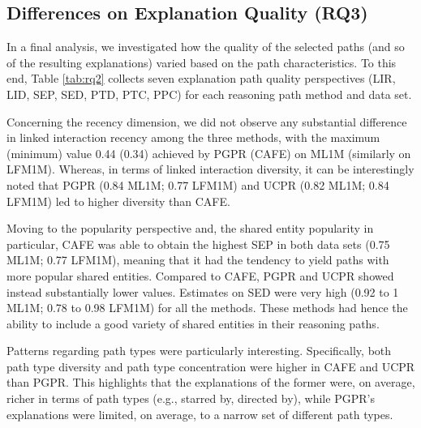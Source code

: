 \documentclass[runningheads]{llncs}
\begin{document}
\subsection{Differences on Explanation Quality (RQ3)}
\label{sec:rq2}
In a final analysis, we investigated how the quality of the selected paths (and so of the resulting explanations) varied based on the path characteristics. 
To this end, Table \ref{tab:rq2} collects seven explanation path quality perspectives (LIR, LID, SEP, SED, PTD, PTC, PPC) for each reasoning path method and data set. 

Concerning the recency dimension, we did not observe any substantial difference in linked interaction recency among the three methods, 
with the maximum (minimum) value 0.44 (0.34) achieved by PGPR (CAFE) on ML1M (similarly on LFM1M).
Whereas, in terms of linked interaction diversity, it can be interestingly noted that PGPR (0.84 ML1M; 0.77 LFM1M) and UCPR (0.82 ML1M; 0.84 LFM1M) led to higher diversity than CAFE. 

Moving to the popularity perspective and, the shared entity popularity in particular, 
CAFE was able to obtain the highest SEP in both data sets (0.75 ML1M; 0.77 LFM1M), 
meaning that it had the tendency to yield paths with more popular shared entities. 
Compared to CAFE, PGPR and UCPR showed instead substantially lower values.
Estimates on SED were very high (0.92 to 1 ML1M; 0.78 to 0.98 LFM1M) for all the methods.
These methods had hence the ability to include a good variety of shared entities in their reasoning paths.

Patterns regarding path types were particularly interesting. 
Specifically, both path type diversity and path type concentration were higher in CAFE and UCPR than PGPR. 
This highlights that the explanations of the former were, on average, richer in terms of path types (e.g., starred by, directed by), 
while PGPR's explanations were limited, on average, to a narrow set of different path types.  
\end{document}
